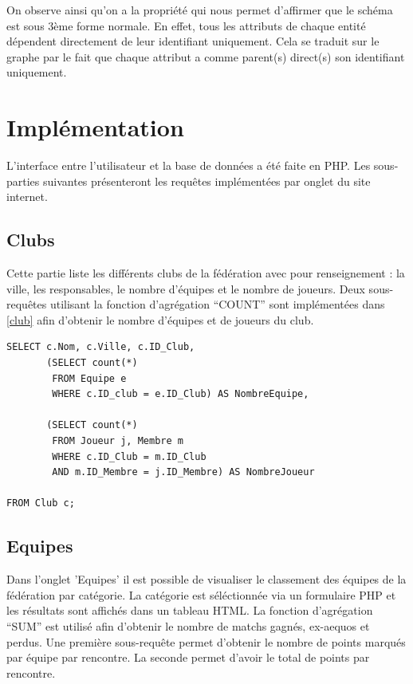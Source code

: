 \documentclass[a4paper,8pt,french,fleqn]{report}
\begin{document}
On observe ainsi qu'on a la propriété qui nous permet d'affirmer que le schéma est sous 3ème forme normale. En effet, tous les attributs de chaque entité dépendent directement de leur identifiant uniquement. Cela se traduit sur le graphe par le fait que chaque attribut a comme parent(s) direct(s) son identifiant uniquement.

\chapter{Implémentation}

L'interface entre l'utilisateur et la base de données a été faite en PHP. Les sous-parties suivantes présenteront les requêtes implémentées par onglet du site internet.

\section{Clubs}

Cette partie liste les différents clubs de la fédération avec pour renseignement : la ville, les responsables, le nombre d'équipes et le nombre de joueurs. Deux sous-requêtes utilisant la fonction d'agrégation ``COUNT'' sont implémentées dans \ref{club} afin d'obtenir le nombre d'équipes et de joueurs du club. 

\begin{lstlisting}
SELECT c.Nom, c.Ville, c.ID_Club,
       (SELECT count(*) 
        FROM Equipe e
        WHERE c.ID_club = e.ID_Club) AS NombreEquipe,

       (SELECT count(*) 
        FROM Joueur j, Membre m
        WHERE c.ID_Club = m.ID_Club
        AND m.ID_Membre = j.ID_Membre) AS NombreJoueur

FROM Club c;
\end{lstlisting}

\section{Equipes}

Dans l'onglet 'Equipes' il est possible de visualiser le classement des équipes de la fédération par catégorie. La catégorie est séléctionnée via un formulaire PHP et les résultats sont affichés dans un tableau HTML. La fonction d'agrégation ``SUM'' est utilisé afin d'obtenir le nombre de matchs gagnés, ex-aequos et perdus. Une première sous-requête permet d'obtenir le nombre de points marqués par équipe par rencontre. La seconde permet d'avoir le total de points par rencontre. 
\end{document}
